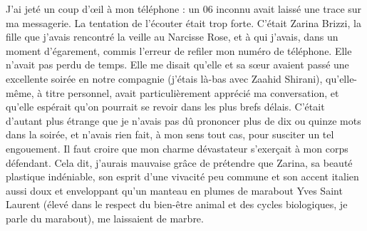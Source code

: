 %
J’ai jeté un coup d’œil à mon téléphone : un 06 inconnu avait laissé une trace sur ma messagerie. La tentation de l’écouter était trop forte. C’était Zarina Brizzi, la fille que j’avais rencontré la veille au Narcisse Rose, et à qui j’avais, dans un moment d’égarement, commis l’erreur de refiler mon numéro de téléphone. Elle n’avait pas perdu de temps. Elle me disait qu’elle et sa sœur avaient passé une excellente soirée en notre compagnie (j’étais là-bas avec Zaahid Shirani), qu’elle-même, à titre personnel, avait particulièrement apprécié ma conversation, et qu’elle espérait qu’on pourrait se revoir dans les plus brefs délais. C’était d’autant plus étrange que je n’avais pas dû prononcer plus de dix ou quinze mots dans la soirée, et n’avais rien fait, à mon sens tout cas, pour susciter un tel engouement. Il faut croire que mon charme dévastateur s’exerçait à mon corps défendant. Cela dit, j’aurais mauvaise grâce de prétendre que Zarina, sa beauté plastique indéniable, son esprit d’une vivacité peu commune et son accent italien aussi doux et enveloppant qu’un manteau en plumes de marabout Yves Saint Laurent (élevé dans le respect du bien-être animal et des cycles biologiques, je parle du marabout), me laissaient de marbre. %
%
